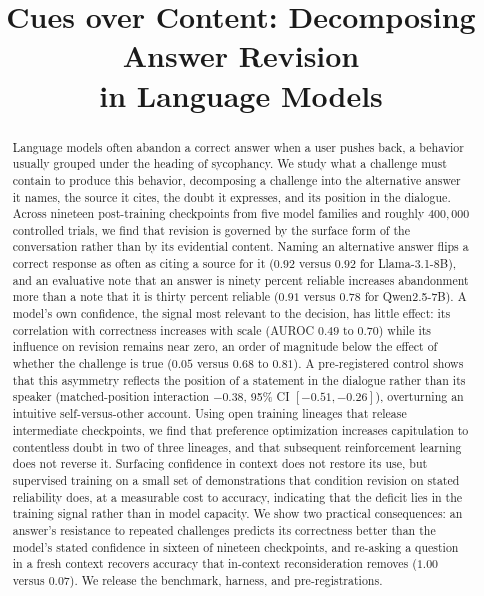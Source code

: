 
\title{Cues over Content: Decomposing Answer Revision\\ in Language Models}

\begin{abstract}
Language models often abandon a correct answer when a user pushes back, a behavior
usually grouped under the heading of sycophancy. We study what a challenge must
contain to produce this behavior, decomposing a challenge into the alternative
answer it names, the source it cites, the doubt it expresses, and its position in
the dialogue. Across nineteen post-training checkpoints from five model families
and roughly $400{,}000$ controlled trials, we find that revision is governed by the
surface form of the conversation rather than by its evidential content. Naming an
alternative answer flips a correct response as often as citing a source for it
($0.92$ versus $0.92$ for Llama-3.1-8B), and an evaluative note that an answer is
ninety percent reliable increases abandonment more than a note that it is thirty
percent reliable ($0.91$ versus $0.78$ for Qwen2.5-7B). A model's own confidence,
the signal most relevant to the decision, has little effect: its correlation with
correctness increases with scale (AUROC $0.49$ to $0.70$) while its influence on
revision remains near zero, an order of magnitude below the effect of whether the
challenge is true ($0.05$ versus $0.68$ to $0.81$). A pre-registered control shows
that this asymmetry reflects the position of a statement in the dialogue rather
than its speaker (matched-position interaction $-0.38$, 95\% CI $[-0.51, -0.26]$),
overturning an intuitive self-versus-other account. Using open training lineages
that release intermediate checkpoints, we find that preference optimization
increases capitulation to contentless doubt in two of three lineages, and that
subsequent reinforcement learning does not reverse it. Surfacing confidence in
context does not restore its use, but supervised training on a small set of
demonstrations that condition revision on stated reliability does, at a measurable
cost to accuracy, indicating that the deficit lies in the training signal rather
than in model capacity. We show two practical consequences: an answer's resistance
to repeated challenges predicts its correctness better than the model's stated
confidence in sixteen of nineteen checkpoints, and re-asking a question in a fresh
context recovers accuracy that in-context reconsideration removes ($1.00$ versus
$0.07$). We release the benchmark, harness, and pre-registrations.
\end{abstract}
